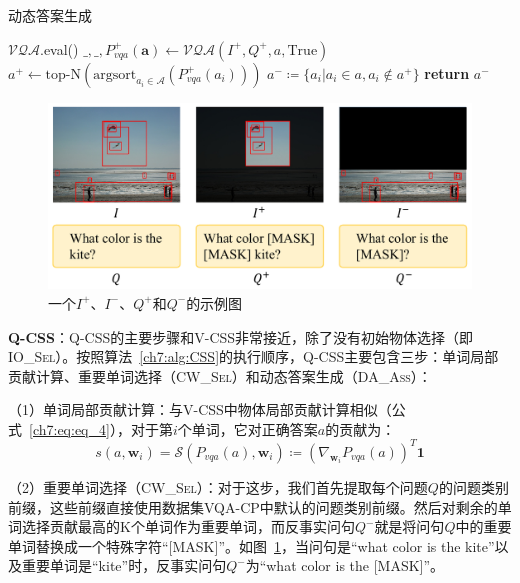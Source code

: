 \begin{algorithm}[tbp]
    \caption{动态答案生成}\label{ch7:alg:daass}
    \begin{algorithmic}[1]
        \State  $\mathcal{VQA}$.eval() 
        \State  $ \_, \_, P_{vqa}^+(\bm{a}) \leftarrow \mathcal{VQA}(I^+, Q^+, a, \text{True}) $
        \State $ a^+ \leftarrow \text{top-N}(\text{argsort}_{a_i \in \mathcal{A}}(P_{vqa}^+(a_i)))$
        \State $ a^- \coloneqq \{a_i | a_i \in a, a_i \notin a^+ \} $ 
        \State \textbf{return} $a^-$
        \EndFunction
    \end{algorithmic}
\end{algorithm}

\begin{figure}[t]
    \centering
        \includegraphics[width=0.9\linewidth]{chapter7/res/IQ+-.pdf}
    \caption{一个$I^+$、$I^-$、$Q^+$和$Q^-$的示例图}
    \label{ch7:fig:IQ+-}
\end{figure}

\textbf{Q-CSS}：Q-CSS的主要步骤和V-CSS非常接近，除了没有初始物体选择（即\textsc{IO\_Sel}）。按照算法~\ref{ch7:alg:CSS}的执行顺序，Q-CSS主要包含三步：单词局部贡献计算、重要单词选择（\textsc{CW\_Sel}）和动态答案生成（\textsc{DA\_Ass}）：

（1）单词局部贡献计算：与V-CSS中物体局部贡献计算相似（公式~\eqref{ch7:eq:eq_4}），对于第$i$个单词，它对正确答案$a$的贡献为：
\begin{equation} \label{ch7:eq:eq_6}
s(a, \bm{w}_i) = \mathcal{S}(P_{vqa}(a), \bm{w}_i) \coloneqq (\nabla_{\bm{w}_i} P_{vqa}(a))^T\mathbf{1}
\end{equation}

（2）重要单词选择（\textsc{CW\_Sel}）：对于这步，我们首先提取每个问题$Q$的问题类别前缀，这些前缀直接使用数据集VQA-CP中默认的问题类别前缀。然后对剩余的单词选择贡献最高的K个单词作为重要单词，而反事实问句$Q^-$就是将问句$Q$中的重要单词替换成一个特殊字符“[MASK]”。如图~\ref{ch7:fig:IQ+-}，当问句是“what color is the kite”以及重要单词是“kite”时，反事实问句$Q^-$为“what color is the [MASK]”。

